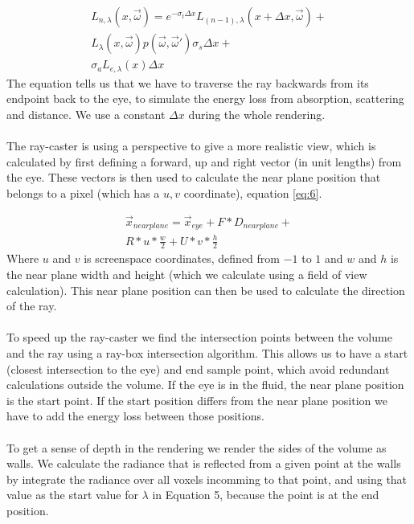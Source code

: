 \begin{equation}
\label{eq:5}
\begin{split}
	L_{n,\lambda}(x,\vec{\omega}) = e^{-\sigma_t\Delta x}L_{(n-1),\lambda}(x+\Delta x,\vec{\omega})+\\
	L_\lambda(x,\vec{\omega})p(\vec{\omega},\vec{\omega}')\sigma_s \Delta x+ \\
	\sigma_a L_{e,\lambda}(x) \Delta x
\end{split}
\end{equation}
The equation tells us that we have to traverse the ray backwards from its endpoint back to the eye, to simulate the energy loss from absorption, scattering and distance. We use a constant $\Delta x$ during the whole rendering. \\\\
The ray-caster is using a perspective to give a more realistic view, which is calculated by first defining a forward, up and right vector (in unit lengths) from the eye. These vectors is then used to calculate the near plane position that belongs to a pixel (which has a $u, v$ coordinate), equation \ref{eq:6}. 

\begin{equation}
\label{eq:6}
\begin{split}
\vec{x}_{nearplane} = \vec{x}_{eye} + F*D_{nearplane} +\\
 R*u*\frac{w}{2} + U*v*\frac{h}{2}
\end{split}
\end{equation}
Where $u$ and $v$ is screenspace coordinates, defined from $-1$ to $1$ and $w$ and $h$ is the near plane width and height (which we calculate using a field of view calculation). This near plane position can then be used to calculate the direction of the ray.  \\\\
To speed up the ray-caster we find the intersection points between the volume and the ray using a ray-box intersection algorithm. This allows us to have a start (closest intersection to the eye) and end sample point, which avoid redundant calculations outside the volume. If the eye is in the fluid, the near plane position is the start point. If the start position differs from the near plane position we have to add the energy loss between those positions. \\\\
To get a sense of depth in the rendering we render the sides of the volume as walls. We calculate the radiance that is reflected from a given point at the walls by integrate the radiance over all voxels incomming to that point, and using that value as the start value for $\lambda$ in Equation 5, because the point is at the end position.
